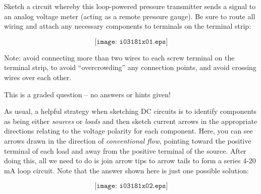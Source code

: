 

Sketch a circuit whereby this loop-powered pressure transmitter sends a signal to an analog voltage meter (acting as a remote pressure gauge).  Be sure to route all wiring and attach any necessary components to terminals on the terminal strip:

\vskip 50pt

$$\texttt{[image: i03181x01.eps]}$$

Note: avoid connecting more than two wires to each screw terminal on the terminal strip, to avoid ``overcrowding'' any connection points, and avoid crossing wires over each other.

\vfil 

\eject






This is a graded question -- no answers or hints given!







As usual, a helpful strategy when sketching DC circuits is to identify components as being either {\it sources} or {\it loads} and then sketch current arrows in the appropriate directions relating to the voltage polarity for each component.  Here, you can see arrows drawn in the direction of {\it conventional flow}, pointing toward the positive terminal of each load and away from the positive terminal of the source.  After doing this, all we need to do is join arrow tips to arrow tails to form a series 4-20 mA loop circuit.  Note that the answer shown here is just one possible solution:

$$\texttt{[image: i03181x02.eps]}$$




